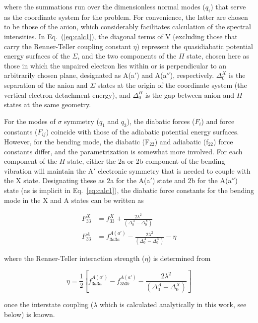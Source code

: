 \documentclass[journal=jpcafh,manuscript=article,layout=onecolumn, 12pt]{achemso}
\begin{document}
where the summations run over the dimensionless normal modes ($q_i$) that serve as the coordinate system for the problem.   For convenience, the latter are chosen to be those of the anion, which considerably facilitates calculation of the spectral intensities.  In Eq.~(\ref{eq:calc1}), the diagonal terms of V (excluding those that carry the Renner-Teller coupling constant $\eta$) represent the quasidiabatic potential energy surfaces of the $\Sigma$, and the two components of the $\Pi$ state, chosen here as those in which the unpaired electron lies within or is perpendicular to an arbitrarily chosen plane, designated as A(a$'$) and A(a$''$), respectively. $\Delta_0^X$ is the separation of the anion and $\Sigma$ states at the origin of the coordinate system (the vertical electron detachment energy), and $\Delta_0^{\Pi}$ is the gap between anion and $\Pi$ states at the same geometry.   

For the modes of $\sigma$ symmetry ($q_1$ and $q_3$), the diabatic forces ($F_i$) and force constants ($F_{ij}$) coincide with those of the adiabatic potential energy surfaces.   However, for the bending mode, the diabatic (F$_{22}$) and adiabatic (f$_{22}$) force constants differ, and the parametrization is somewhat more involved.   For each component of the $\Pi$ state, either the 2a or 2b component of the bending vibration will maintain the A$'$ electronic symmetry that is needed to couple with the X state.  Designating these as 2a for the A(a$'$) state and 2b for the A(a$''$) state (as is implicit in Eq.~\ref{eq:calc1}), the diabatic force constants for the bending mode in the X and A states can be written as 

\begin{align}
F_{33}^X &= f_{33}^X+\frac{2\lambda^2}{(\Delta_0^A-\Delta_0^X)}\\
F_{33}^A &= f_{3a3a}^{A(a')}-\frac{2\lambda^2}{(\Delta_0^A-\Delta_0^X)}-\eta
\label{eq:calc2}
\end{align}

where the Renner-Teller interaction strength ($\eta$) is determined from 

\begin{equation}
\eta = \frac{1}{2}\left[ f_{3a3a}^{A(a')}-f_{3b3b}^{A(a')}-\frac{2\lambda^2}{(\Delta_0^A-\Delta_0^X)}\right]
\label{eq:calc3}
\end{equation}

once the interstate coupling ($\lambda$ which is calculated analytically in this work, see below) is known.
\end{document}
